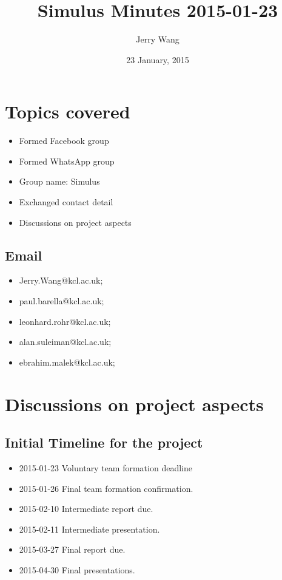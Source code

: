 \documentclass{article}
\author {Jerry Wang}
\title{Simulus Minutes 2015-01-23}
\date {23 January, 2015}
\begin{document}
\maketitle

\section {Topics covered}
\begin{itemize}
\item Formed Facebook group 
\item Formed WhatsApp group 
\item Group name: Simulus
\item Exchanged contact detail 
\item Discussions on project aspects 
\end{itemize}

\subsection {Email}
\begin{itemize}
\item Jerry.Wang@kcl.ac.uk; 
 \item  paul.barella@kcl.ac.uk;
 \item leonhard.rohr@kcl.ac.uk;
  \item alan.suleiman@kcl.ac.uk;
 \item ebrahim.malek@kcl.ac.uk;
\end{itemize}

\section {Discussions on project aspects }

\subsection{Initial Timeline for the project}
\begin{itemize}
\item 2015-01-23 Voluntary team formation deadline
\item 2015-01-26 Final team formation confirmation.
\item 2015-02-10 Intermediate report due.
\item 2015-02-11 Intermediate presentation.
\item 2015-03-27 Final report due.
\item 2015-04-30 Final presentations.
\end{itemize}
\end{document}
